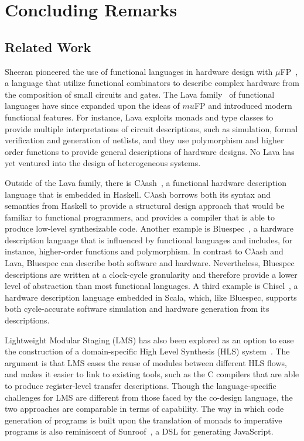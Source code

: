 \documentclass[../paper.tex]{subfiles}
\begin{document}
\chapter{Concluding Remarks}

\section{Related Work}
\label{related}

Sheeran pioneered the use of functional languages in hardware design with $\mu$FP~\cite{sheeran1984}, a language that utilize functional combinators to describe complex hardware from the composition of small circuits and gates. The Lava family~\cite{bjesse1998, gill2010, york-lava} of functional languages have since expanded upon the ideas of $mu$FP and introduced modern functional features. For instance, Lava exploits monads and type classes to provide multiple interpretations of circuit descriptions, such as simulation, formal verification and generation of netlists, and they use polymorphism and higher order functions to provide general descriptions of hardware designs. No Lava has yet ventured into the design of heterogeneous systems.

Outside of the Lava family, there is C$\lambda$ash~\cite{baaij2010}, a functional hardware description language that is embedded in Haskell. C$\lambda$ash borrows both its syntax and semantics from Haskell to provide a structural design approach that would be familiar to functional programmers, and provides a compiler that is able to produce low-level synthesizable code. Another example is Bluespec~\cite{nikhil2004}, a hardware description language that is influenced by functional languages and includes, for instance, higher-order functions and polymorphism. In contrast to C$\lambda$ash and Lava, Bluespec can describe both software and hardware. Nevertheless, Bluespec descriptions are written at a clock-cycle granularity and therefore provide a lower level of abstraction than most functional languages. A third example is Chisel~\cite{bachrach2012}, a hardware description language embedded in Scala, which, like Bluespec, supports both cycle-accurate software simulation and hardware generation from its descriptions.

Lightweight Modular Staging (LMS) has also been explored as an option to ease the construction of a domain-specific High Level Synthesis (HLS) system~\cite{george2013}. The argument is that LMS eases the reuse of modules between different HLS flows, and makes it easier to link to existing tools, such as the C compilers that are able to produce register-level transfer descriptions. Though the language-specific challenges for LMS are different from those faced by the co-design language, the two approaches are comparable in terms of capability. The way in which code generation of programs is built upon the translation of monads to imperative programs is also reminiscent of Sunroof~\cite{gill2014}, a DSL for generating JavaScript.
\end{document}
